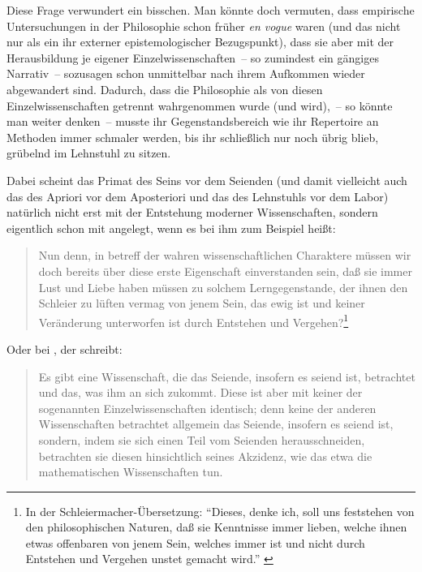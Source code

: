 \documentclass[justified,nobib,nohyper,symmetric,twoside]{tufte-book}
\begin{document}
Diese Frage verwundert ein bisschen.
Man könnte doch vermuten, dass empirische Untersuchungen in der Philosophie schon früher \textit{en vogue} waren (und das nicht nur als ein ihr externer epistemologischer Bezugspunkt), dass sie aber mit der Herausbildung je eigener Einzelwissenschaften~-- so zumindest ein gängiges Narrativ~-- sozusagen schon unmittelbar nach ihrem Aufkommen wieder abgewandert sind.
Dadurch, dass die Philosophie als von diesen Einzelwissenschaften getrennt wahrgenommen wurde (und wird),~-- so könnte man weiter denken~-- musste ihr Gegenstandsbereich wie ihr Repertoire an Methoden immer schmaler werden, bis ihr schließlich nur noch übrig blieb, grübelnd im Lehnstuhl zu sitzen.

Dabei scheint das Primat des Seins vor dem Seienden (und damit vielleicht auch das des Apriori vor dem Aposteriori und das des Lehnstuhls vor dem Labor) natürlich nicht erst mit der Entstehung moderner Wissenschaften, sondern eigentlich schon mit \citet[S.~207, 485\,a--486\,b]{platon_staat_2004} angelegt, wenn es bei ihm zum Beispiel heißt:

\begin{quote}
   Nun denn, in betreff der wahren wissenschaftlichen Charaktere müssen wir doch bereits über diese erste Eigenschaft einverstanden sein, daß sie immer Lust und Liebe haben müssen zu solchem Lerngegenstande, der ihnen den Schleier zu lüften vermag von jenem Sein, das ewig ist und keiner Veränderung unterworfen ist durch Entstehen und Vergehen?\footnote{In der Schleiermacher-Übersetzung: \enquote{Dieses, denke ich, soll uns feststehen von den philosophischen Naturen, daß sie Kenntnisse immer lieben, welche ihnen etwas offenbaren von jenem Sein, welches immer ist und nicht durch Entstehen und Vergehen unstet gemacht wird.} \citep[S.~201]{platon_politeia_1958}}
\end{quote}

\noindent Oder bei \citet[S.~82, 1003\,a]{aristoteles_metaphysik_2000}, der schreibt:

\begin{quote}
   Es gibt eine Wissenschaft, die das Seiende, insofern es seiend ist, betrachtet und das, was ihm an sich zukommt.
   Diese ist aber mit keiner der sogenannten Einzelwissenschaften identisch; denn keine der anderen Wissenschaften betrachtet allgemein das Seiende, insofern es seiend ist, sondern, indem sie sich einen Teil vom Seienden herausschneiden, betrachten sie diesen hinsichtlich seines Akzidenz, wie das etwa die mathematischen Wissenschaften tun.
\end{quote}
\end{document}
